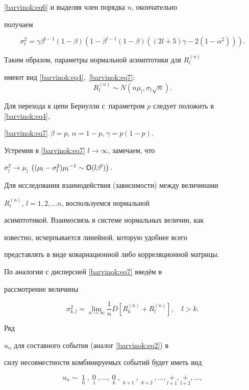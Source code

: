 \eqref{barvinok:eq6} и выделяя член порядка $n$, окончательно

получаем

\begin{equation}

\label{barvinok:eq7} \sigma _l^2 =\gamma \beta

^{l-1}(1-\beta)\left(1-\beta^{l-1}(1-\beta) \left( (2l+5)\gamma

-2(1-\alpha ^2) \right) \right).

\end{equation}

Таким образом, параметры нормальной асимптотики для $R_l^{(n)} $

имеют вид \eqref{barvinok:eq4},~\eqref{barvinok:eq7}: $$R_l^{(n)}

\sim N(n\mu_l,\sigma _l\sqrt n).$$ 

Для перехода к цепи Бернулли с~параметром $p$ следует положить в \eqref{barvinok:eq4},

\eqref{barvinok:eq7} $\beta =p$, $\alpha =1-p$, $\gamma =p (1-p)$.



Устремив в \eqref{barvinok:eq7} $l\to \infty $, замечаем, что

$\sigma _l^2 \to \mu _l$ $\left(({\mu _l -\sigma _l^2}){\mu _l }^{-1}\sim {\sf O} (l\beta ^l) \right).$



Для исследования взаимодействия (зависимости) между величинами

$R_l^{( n )}$, $l=1, 2, \ldots n$, воспользуемся нормальной

асимптотикой. Взаимосвязь в системе нормальных величин, как

известно, исчерпывается линейной, которую удобнее всего

представлять в виде ковариационной либо корреляционной матрицы.

По аналогии с дисперсией \eqref{barvinok:eq7} введём в

рассмотрение величины 

$$\sigma _{k,l}^2 =\lim \limits_{n\to \infty } \frac{1}{n}D \left[R_k^{(n)} +R_l^{(n)} \right],\quad  l>k.$$ 

Ряд

$u_n $ для составного события (аналог \eqref{barvinok:eq2}) в

силу несовместности комбинируемых событий  будет иметь вид

\begin{equation}

\label{barvinok:eq8}

 u_n \sim \mathop 1\limits_0,\mathop

0\limits_1 ,\ldots,\mathop 0\limits_k ,\mathop {\mu _k^0

}\limits_{k+1} ,\mathop {\mu _k^1 }\limits_{k+2} ,\ldots,\mathop

{\mu _k^1 +\mu _l^0 }\limits_{l+1} ,\mathop {\mu _k^1 +\mu _l^1

}\limits_{l+2} ,\ldots,

\end{equation}

